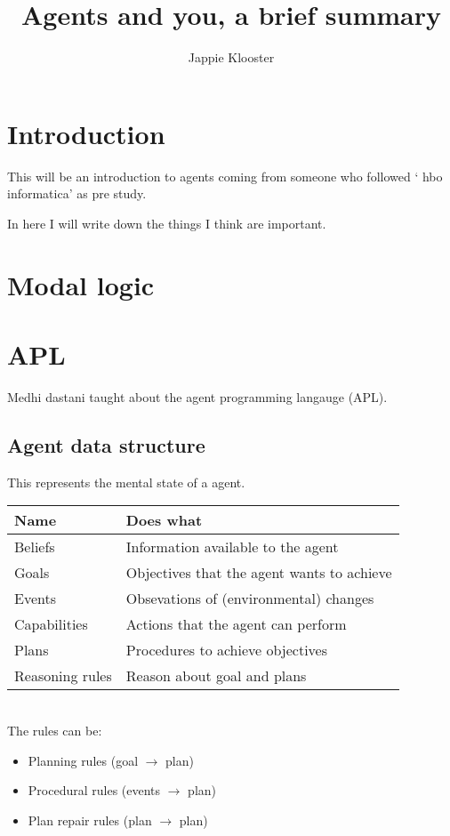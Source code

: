 \documentclass{article}
\begin{document}
\lstset{language=Java}
\author{Jappie Klooster}
\title{Agents and you, a brief summary}
\maketitle

\section{Introduction}
This will be an introduction to agents coming from someone who followed
` hbo informatica' as pre study.

In here I will write down the things I think are important.

\section{Modal logic}

\section{APL}
Medhi dastani taught about the agent programming langauge (APL).
\subsection{Agent data structure}
This represents the mental state of a agent. \\
\begin{tabular}{ll}
	Name & Does what \\ \toprule
	Beliefs & Information available to the agent \\
	Goals & Objectives that the agent wants to achieve \\
	Events & Obsevations of (environmental) changes \\
	Capabilities & Actions that the agent can perform \\
	Plans & Procedures to achieve objectives \\
	Reasoning rules & Reason about goal and plans \\
\end{tabular} \\

\noindent
The rules can be:

\begin{itemize}
	\item Planning rules (goal $\to$ plan)
	\item Procedural rules (events $\to$ plan)
	\item Plan repair rules (plan $\to$ plan)
\end{itemize}
\end{document}
